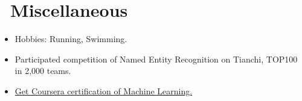 \documentclass{resume}
\begin{document}



\section{\faInfo\  Miscellaneous}\normalsize
\begin{itemize}
\item {Hobbies: Running, Swimming.}
\item{Participated competition of Named Entity Recognition on Tianchi, TOP100 in 2,000 teams.}
\item {\href{https://www.coursera.org/account/accomplishments/verify/NFCZEBTZ5T4L}{Get Coursera certification of Machine Learning.} }
\end{itemize}

%
%
\end{document}
